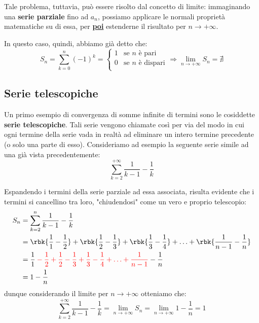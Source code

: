 \documentclass[a4paper, 12pt]{report}
\begin{document}
    Tale problema, tuttavia, può essere risolto dal concetto di limite: immaginando una \textbf{serie parziale} fino ad $a_n$, possiamo applicare le normali proprietà matematiche su di essa, per \textbf{\underline{poi}} estenderne il risultato per $n \to +\infty$.
    
    In questo caso, quindi, abbiamo già detto che:
    $$
    S_n = \sum_{k = 0}^n (-1)^k= \left \{ \begin{array}{ll}
            1 & \text{se } n \text{ è pari}\\
            0 & \text{se } n \text{ è dispari}\\
        \end{array} \right .
    \Longrightarrow \lim_{n \to +\infty} S_n = \nexists
    $$
   
    \quad

    \subsection{Serie telescopiche}

    Un primo esempio di convergenza di somme infinite di termini sono le cosiddette \textbf{serie telescopiche}. Tali serie vengono chiamate così per via del modo in cui ogni termine della serie vada in realtà ad eliminare un intero termine precedente (o solo una parte di esso). Consideriamo ad esempio la seguente serie simile ad una già vista precedentemente:
    \[\sum_{k = 2}^{+\infty} \frac{1}{k-1} - \frac{1}{k}\]

    Espandendo i termini della serie parziale ad essa associata, risulta evidente che i termini si cancellino tra loro, "chiudendosi" come un vero e proprio telescopio:
    \[\begin{split}
        S_n &= \sum_{k = 2}^{n} \frac{1}{k-1} - \frac{1}{k} \\
        &= \rbk{\frac{1}{1} - \frac{1}{2}} + \rbk{\frac{1}{2} - \frac{1}{3}} + \rbk{\frac{1}{3} - \frac{1}{4}} + \ldots + \rbk{\frac{1}{n-1} - \frac{1}{n}} \\
        &= \frac{1}{1} \color{red}- \frac{1}{2} + \frac{1}{2} - \frac{1}{3} + \frac{1}{3} - \frac{1}{4} + \ldots + \frac{1}{n-1} \color{black} - \frac{1}{n} \\
        &= 1 - \frac{1}{n}
    \end{split}\]
    dunque considerando il limite per $n \to +\infty$ otteniamo che:
    \[\sum_{k = 2}^{+\infty} \frac{1}{k-1} - \frac{1}{k} = \lim_{n \to +\infty} S_n = \lim_{n \to +\infty} 1 - \frac{1}{n} = 1\]
\end{document}
